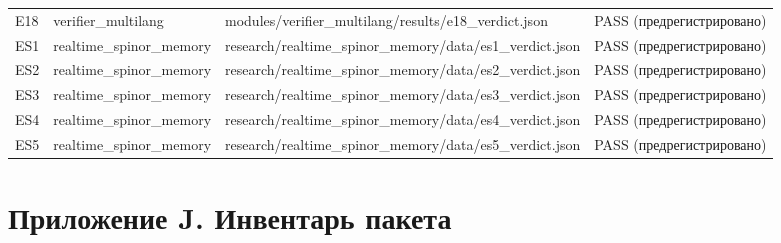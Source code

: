 \documentclass[11pt,a4paper]{article}
\begin{document}
\begin{table}[htbp]
\begin{tabular}{p{} p{} p{} p{}}
E18 & verifier\_multilang & modules/verifier\_multilang/results/e18\_verdict.json & PASS (предрегистрировано) \\
ES1 & realtime\_spinor\_memory & research/realtime\_spinor\_memory/data/es1\_verdict.json & PASS (предрегистрировано) \\
ES2 & realtime\_spinor\_memory & research/realtime\_spinor\_memory/data/es2\_verdict.json & PASS (предрегистрировано) \\
ES3 & realtime\_spinor\_memory & research/realtime\_spinor\_memory/data/es3\_verdict.json & PASS (предрегистрировано) \\
ES4 & realtime\_spinor\_memory & research/realtime\_spinor\_memory/data/es4\_verdict.json & PASS (предрегистрировано) \\
ES5 & realtime\_spinor\_memory & research/realtime\_spinor\_memory/data/es5\_verdict.json & PASS (предрегистрировано) \\
\bottomrule
\end{tabular}
\end{table}

\section{Приложение J. Инвентарь пакета}
\end{document}
